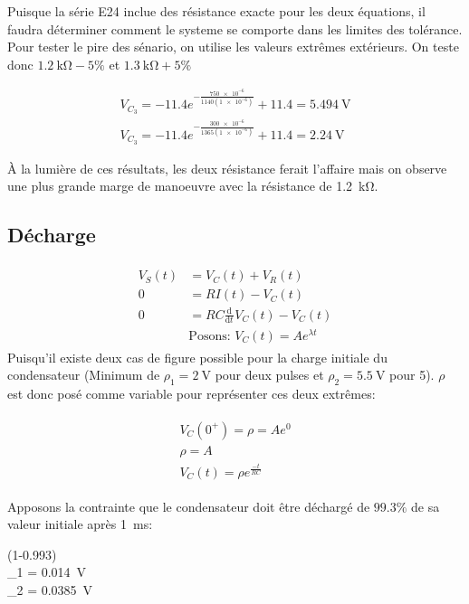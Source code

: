 \documentclass[a11paper, 11pt]{article}
\newcommand{\ddt}[1]{\frac{\text{d}^{#1}}{\text{d}t^{#1}}}
\newcommand{\la}{\lambda}
\begin{document}
\begin{appendix}
	Puisque la série E24 inclue des résistance exacte pour les deux équations,
	il faudra déterminer comment le systeme se comporte dans les limites
	des tolérance.
	Pour tester le pire des sénario, on utilise les valeurs extrêmes extérieurs.
	On teste donc $\SI{1.2}{\kohm} - 5\%$ et $\SI{1.3}{\kohm} + 5\%$

	\begin{gather}
		V_{C_3} = -11.4e^{-\frac{\num{750e-6}}{1140(\num{1e-6})}} + 11.4 = \SI{5.494}{\V} \\
		V_{C_3} = -11.4e^{-\frac{\num{300e-6}}{1365(\num{1e-6})}} + 11.4 = \SI{2.24}{\V}
	\end{gather}

	À la lumière de ces résultats, les deux résistance ferait l'affaire mais
	on observe une plus grande marge de manoeuvre avec la résistance de \SI{1.2}{\kohm}.

	\subsection{Décharge}
	\begin{gather*}
		\begin{align}
			V_S(t)    & = V_C(t) + V_R(t)                   \\
			0         & = RI(t) - V_C(t)                    \\
			0         & =RC\ddt{}V_C(t) - V_C(t)            \\
			\nonumber & \text{Posons: } V_C(t) = Ae^{\la t}
		\end{align}
	\end{gather*}
	Puisqu'il existe deux cas de figure possible pour la charge initiale du
	condensateur (Minimum de $\rho_1=\SI{2}{\V}$ pour deux pulses et $\rho_2=\SI{5.5}{\V}$ pour 5).
	$\rho$ est donc posé comme variable pour représenter ces deux extrêmes:

	\begin{gather*}
		\begin{align}
			V_C(0^+) = \rho = A e^0 \\
			\rho = A                \\
			V_C(t) = \rho e^{\frac{-t}{RC}}
		\end{align}
	\end{gather*}

	Apposons la contrainte que le condensateur doit être déchargé de $99.3\%$ de sa valeur
	initiale après \SI{1}{\ms}:
	\begin{DispWithArrows}[format=c]
		(1-0.993)\rho {}\\
		\sigma_1 = \SI{0.014}{\V} \\
		\sigma_2 = \SI{0.0385}{\V}
	\end{DispWithArrows}


\end{appendix}
\end{document}
